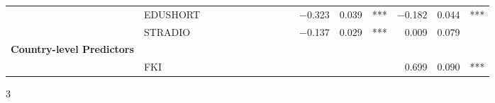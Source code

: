 {\begin{tabular}{l @{\hskip -3.5cm} l rr l rr l rr l rr l rr l}
            & EDUSHORT &       &       &       &       &       &       &       &       &       & $-$0.323 & 0.039 & \multicolumn{1}{l}{***} & $-$0.182 & 0.044 & *** \\
            & STRADIO &       &       &       &       &       &       &       &       &       & $-$0.137 & 0.029 & \multicolumn{1}{l}{***} & 0.009 & 0.079 &  \\
      \textbf{Country-level Predictors} &       &       &       &       &       &       &       &       &       &       &       &       &       &       &       &  \\
            & FKI   &       &       &       &       &       &       &       &       &       &       &       &       & 0.699 & 0.090 & *** \\
      \end{tabular}
}{3}
